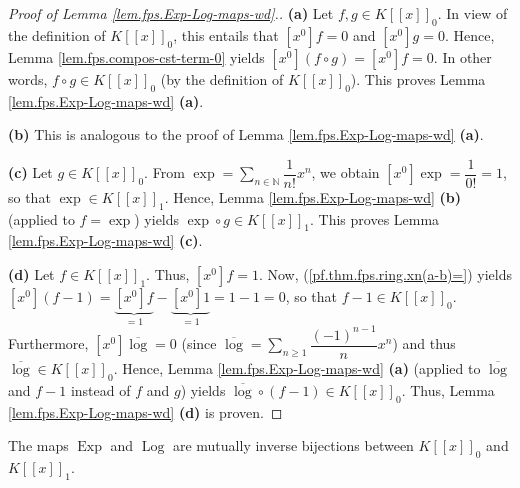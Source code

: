 \begin{proof}
[Proof of Lemma \ref{lem.fps.Exp-Log-maps-wd}.]\textbf{(a)} Let $f,g\in
K\left[  \left[  x\right]  \right]  _{0}$. In view of the definition of
$K\left[  \left[  x\right]  \right]  _{0}$, this entails that $\left[
x^{0}\right]  f=0$ and $\left[  x^{0}\right]  g=0$. Hence, Lemma
\ref{lem.fps.compos-cst-term-0} yields $\left[  x^{0}\right]  \left(  f\circ
g\right)  =\left[  x^{0}\right]  f=0$. In other words, $f\circ g\in K\left[
\left[  x\right]  \right]  _{0}$ (by the definition of $K\left[  \left[
x\right]  \right]  _{0}$). This proves Lemma \ref{lem.fps.Exp-Log-maps-wd}
\textbf{(a)}.

\textbf{(b)} This is analogous to the proof of Lemma
\ref{lem.fps.Exp-Log-maps-wd} \textbf{(a)}.

\textbf{(c)} Let $g\in K\left[  \left[  x\right]  \right]  _{0}$. From
$\exp=\sum_{n\in\mathbb{N}}\dfrac{1}{n!}x^{n}$, we obtain $\left[
x^{0}\right]  \exp=\dfrac{1}{0!}=1$, so that $\exp\in K\left[  \left[
x\right]  \right]  _{1}$. Hence, Lemma \ref{lem.fps.Exp-Log-maps-wd}
\textbf{(b)} (applied to $f=\exp$) yields $\exp\circ g\in K\left[  \left[
x\right]  \right]  _{1}$. This proves Lemma \ref{lem.fps.Exp-Log-maps-wd}
\textbf{(c)}.

\textbf{(d)} Let $f\in K\left[  \left[  x\right]  \right]  _{1}$. Thus,
$\left[  x^{0}\right]  f=1$. Now, (\ref{pf.thm.fps.ring.xn(a-b)=}) yields
$\left[  x^{0}\right]  \left(  f-1\right)  =\underbrace{\left[  x^{0}\right]
f}_{=1}-\underbrace{\left[  x^{0}\right]  1}_{=1}=1-1=0$, so that $f-1\in
K\left[  \left[  x\right]  \right]  _{0}$. Furthermore, $\left[  x^{0}\right]
\overline{\log}=0$ (since $\overline{\log}=\sum_{n\geq1}\dfrac{\left(
-1\right)  ^{n-1}}{n}x^{n}$) and thus $\overline{\log}\in K\left[  \left[
x\right]  \right]  _{0}$. Hence, Lemma \ref{lem.fps.Exp-Log-maps-wd}
\textbf{(a)} (applied to $\overline{\log}$ and $f-1$ instead of $f$ and $g$)
yields $\overline{\log}\circ\left(  f-1\right)  \in K\left[  \left[  x\right]
\right]  _{0}$. Thus, Lemma \ref{lem.fps.Exp-Log-maps-wd} \textbf{(d)} is proven.
\end{proof}

\begin{lemma}
\label{lem.fps.Exp-Log-maps-inv}The maps $\operatorname*{Exp}$ and
$\operatorname*{Log}$ are mutually inverse bijections between $K\left[
\left[  x\right]  \right]  _{0}$ and $K\left[  \left[  x\right]  \right]
_{1}$.
\end{lemma}

